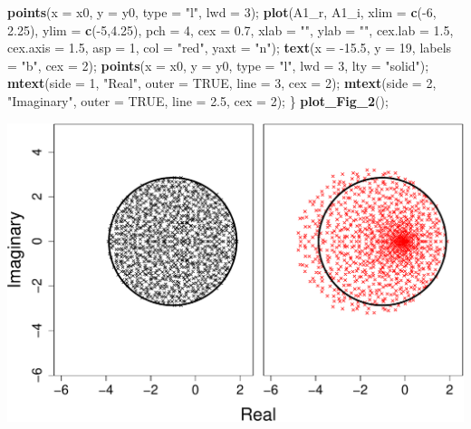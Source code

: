 \documentclass[]{article}
\newenvironment{Shaded}{\begin{snugshade}}{\end{snugshade}}
\newcommand{\KeywordTok}[1]{\textcolor[rgb]{0.13,0.29,0.53}{\textbf{{#1}}}}
\newcommand{\DataTypeTok}[1]{\textcolor[rgb]{0.13,0.29,0.53}{{#1}}}
\newcommand{\DecValTok}[1]{\textcolor[rgb]{0.00,0.00,0.81}{{#1}}}
\newcommand{\FloatTok}[1]{\textcolor[rgb]{0.00,0.00,0.81}{{#1}}}
\newcommand{\StringTok}[1]{\textcolor[rgb]{0.31,0.60,0.02}{{#1}}}
\newcommand{\OtherTok}[1]{\textcolor[rgb]{0.56,0.35,0.01}{{#1}}}
\newcommand{\NormalTok}[1]{{#1}}
\begin{document}
\begin{Shaded}
\begin{Highlighting}[]
    \KeywordTok{points}\NormalTok{(}\DataTypeTok{x =} \NormalTok{x0, }\DataTypeTok{y =} \NormalTok{y0, }\DataTypeTok{type =} \StringTok{"l"}\NormalTok{, }\DataTypeTok{lwd =} \DecValTok{3}\NormalTok{);}
    \KeywordTok{plot}\NormalTok{(A1_r, A1_i, }\DataTypeTok{xlim =} \KeywordTok{c}\NormalTok{(-}\DecValTok{6}\NormalTok{, }\FloatTok{2.25}\NormalTok{), }\DataTypeTok{ylim =} \KeywordTok{c}\NormalTok{(-}\DecValTok{5}\NormalTok{,}\FloatTok{4.25}\NormalTok{), }\DataTypeTok{pch =} \DecValTok{4}\NormalTok{, }\DataTypeTok{cex =} \FloatTok{0.7}\NormalTok{,}
         \DataTypeTok{xlab =} \StringTok{""}\NormalTok{, }\DataTypeTok{ylab =} \StringTok{""}\NormalTok{, }\DataTypeTok{cex.lab =} \FloatTok{1.5}\NormalTok{, }\DataTypeTok{cex.axis =} \FloatTok{1.5}\NormalTok{, }\DataTypeTok{asp =} \DecValTok{1}\NormalTok{, }\DataTypeTok{col =} \StringTok{"red"}\NormalTok{,}
         \DataTypeTok{yaxt =} \StringTok{"n"}\NormalTok{);}
    \KeywordTok{text}\NormalTok{(}\DataTypeTok{x =} \NormalTok{-}\FloatTok{15.5}\NormalTok{, }\DataTypeTok{y =} \DecValTok{19}\NormalTok{, }\DataTypeTok{labels =} \StringTok{"b"}\NormalTok{, }\DataTypeTok{cex =} \DecValTok{2}\NormalTok{);}
    \KeywordTok{points}\NormalTok{(}\DataTypeTok{x =} \NormalTok{x0, }\DataTypeTok{y =} \NormalTok{y0, }\DataTypeTok{type =} \StringTok{"l"}\NormalTok{, }\DataTypeTok{lwd =} \DecValTok{3}\NormalTok{, }\DataTypeTok{lty =} \StringTok{"solid"}\NormalTok{);}
    \KeywordTok{mtext}\NormalTok{(}\DataTypeTok{side =} \DecValTok{1}\NormalTok{, }\StringTok{"Real"}\NormalTok{, }\DataTypeTok{outer =} \OtherTok{TRUE}\NormalTok{, }\DataTypeTok{line =} \DecValTok{3}\NormalTok{, }\DataTypeTok{cex =} \DecValTok{2}\NormalTok{);}
    \KeywordTok{mtext}\NormalTok{(}\DataTypeTok{side =} \DecValTok{2}\NormalTok{, }\StringTok{"Imaginary"}\NormalTok{, }\DataTypeTok{outer =} \OtherTok{TRUE}\NormalTok{, }\DataTypeTok{line =} \FloatTok{2.5}\NormalTok{, }\DataTypeTok{cex =} \DecValTok{2}\NormalTok{);}
\NormalTok{\}}
\KeywordTok{plot_Fig_2}\NormalTok{();}
\end{Highlighting}
\end{Shaded}

\includegraphics{SI_science_files/figure-latex/unnamed-chunk-9-1.pdf}
\end{document}
